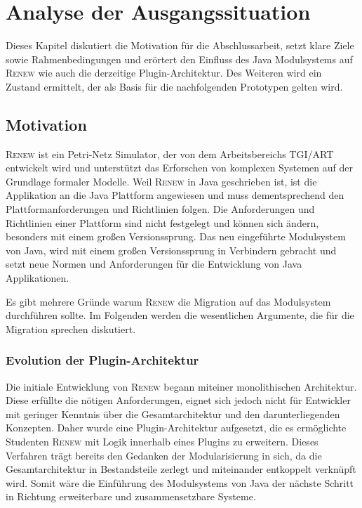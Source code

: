 \chapter{Analyse der Ausgangssituation} \label{cha:ausgangssituation}
	Dieses Kapitel diskutiert die Motivation für die Abschlussarbeit, setzt klare Ziele sowie Rahmenbedingungen und erörtert den Einfluss des Java Modulsystems auf \textsc{Renew} wie auch die derzeitige Plugin-Architektur. Des Weiteren wird ein Zustand ermittelt, der als Basis für die nachfolgenden Prototypen gelten wird.

\section{Motivation}\label{sec:motivation2}
	\textsc{Renew} ist ein Petri-Netz Simulator, der von dem Arbeitsbereichs TGI/ART entwickelt wird und unterstützt das Erforschen von komplexen Systemen auf der Grundlage formaler Modelle.\newline
	Weil \textsc{Renew} in Java geschrieben ist, ist die Applikation an die Java Plattform angewiesen und muss dementsprechend den Plattformanforderungen und Richtlinien folgen. Die Anforderungen und Richtlinien einer Plattform sind nicht festgelegt und können sich ändern, besonders mit einem großen Versionssprung. Das neu eingeführte Modulsystem von Java, wird mit einem großen Versionssprung in Verbindern gebracht und setzt neue Normen und Anforderungen für die Entwicklung von Java Applikationen. \bigbreak
	
	Es gibt mehrere Gründe warum \textsc{Renew} die Migration auf das Modulsystem durchführen sollte. Im Folgenden werden die wesentlichen Argumente, die für die Migration sprechen diskutiert.  

	\subsection{Evolution der Plugin-Architektur} \label{sub:architektur}
		Die initiale Entwicklung von \textsc{Renew} begann miteiner monolithischen Architektur. Diese erfüllte die nötigen Anforderungen, eignet sich jedoch nicht für Entwickler mit geringer Kenntnis über die Gesamtarchitektur und den darunterliegenden Konzepten. Daher wurde eine Plugin-Architektur aufgesetzt, die es ermöglichte Studenten \textsc{Renew} mit Logik innerhalb eines Plugins zu erweitern. Dieses Verfahren trägt bereits den Gedanken der Modularisierung in sich, da die Gesamtarchitektur in Bestandsteile zerlegt und miteinander entkoppelt verknüpft wird. Somit wäre die Einführung des Modulsystems von Java der nächste Schritt in Richtung erweiterbare und zusammensetzbare Systeme.

